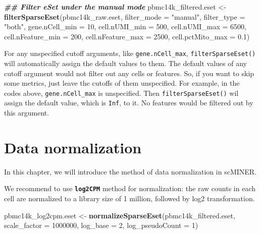 \documentclass[
  12pt,
]{book}
\newenvironment{Shaded}{\begin{snugshade}}{\end{snugshade}}
\newcommand{\AttributeTok}[1]{\textcolor[rgb]{0.13,0.29,0.53}{#1}}
\newcommand{\DecValTok}[1]{\textcolor[rgb]{0.00,0.00,0.81}{#1}}
\newcommand{\DocumentationTok}[1]{\textcolor[rgb]{0.56,0.35,0.01}{\textbf{\textit{#1}}}}
\newcommand{\FloatTok}[1]{\textcolor[rgb]{0.00,0.00,0.81}{#1}}
\newcommand{\FunctionTok}[1]{\textcolor[rgb]{0.13,0.29,0.53}{\textbf{#1}}}
\newcommand{\NormalTok}[1]{#1}
\newcommand{\OtherTok}[1]{\textcolor[rgb]{0.56,0.35,0.01}{#1}}
\newcommand{\StringTok}[1]{\textcolor[rgb]{0.31,0.60,0.02}{#1}}
\begin{document}
\begin{Shaded}
\begin{Highlighting}[]
\DocumentationTok{\#\# Filter eSet under the manual mode}
\NormalTok{pbmc14k\_filtered.eset }\OtherTok{\textless{}{-}} \FunctionTok{filterSparseEset}\NormalTok{(pbmc14k\_raw.eset, }\AttributeTok{filter\_mode =} \StringTok{"manual"}\NormalTok{, }\AttributeTok{filter\_type =} \StringTok{"both"}\NormalTok{, }\AttributeTok{gene.nCell\_min =} \DecValTok{10}\NormalTok{, }\AttributeTok{cell.nUMI\_min =} \DecValTok{500}\NormalTok{, }\AttributeTok{cell.nUMI\_max =} \DecValTok{6500}\NormalTok{, }\AttributeTok{cell.nFeature\_min =} \DecValTok{200}\NormalTok{, }\AttributeTok{cell.nFeature\_max =} \DecValTok{2500}\NormalTok{, }\AttributeTok{cell.pctMito\_max =} \FloatTok{0.1}\NormalTok{)}
\end{Highlighting}
\end{Shaded}

For any unspecified cutoff arguments, like \texttt{gene.nCell\_max}, \texttt{filterSparseEset()} will automatically assign the default values to them. The default values of any cutoff argument would not filter out any cells or features. So, if you want to skip some metrics, just leave the cutoffs of them unspecified. For example, in the codes above, \texttt{gene.nCell\_max} is unspecified. Then \texttt{filterSparseEset()} wil assign the default value, which is \texttt{Inf}, to it. No features would be filtered out by this argument.

\chapter{Data normalization}\label{data-normalization}

In this chapter, we will introduce the method of data normalization in scMINER.

We recommend to use \textbf{\texttt{log2CPM}} method for normalization: the raw counts in each cell are normalized to a library size of 1 million, followed by log2 transformation.

\begin{Shaded}
\begin{Highlighting}[]
\NormalTok{pbmc14k\_log2cpm.eset }\OtherTok{\textless{}{-}} \FunctionTok{normalizeSparseEset}\NormalTok{(pbmc14k\_filtered.eset, }\AttributeTok{scale\_factor =} \DecValTok{1000000}\NormalTok{, }\AttributeTok{log\_base =} \DecValTok{2}\NormalTok{, }\AttributeTok{log\_pseudoCount =} \DecValTok{1}\NormalTok{)}
\end{Highlighting}
\end{Shaded}
\end{document}

